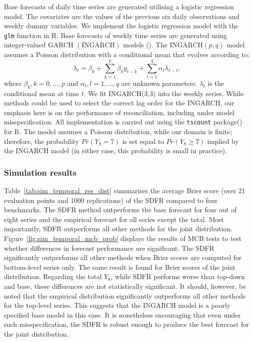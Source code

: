 \documentclass[a4paper,review,11pt,authoryear]{elsarticle}
\let\code=\texttt
\let\proglang=\textsf
\theoremstyle{definition}
\begin{document}
     Base forecasts of daily time series are generated utilising a logistic regression model. The covariates are the values of the previous six daily observations and weekly dummy variables. We implement the logistic regression model with the \code{glm} function in \proglang{R}. Base forecasts of weekly time series are generated using integer-valued GARCH $(\textrm{INGARCH})$ models (). The $\textrm{INGARCH}(p, q)$ model assumes a Poisson distribution with a conditional mean that evolves according to:
     \[
      \lambda_t = \beta_0 + \sum_{k=1}^p \beta_ky_{t-k} + \sum_{l=1}^q \alpha_l\lambda_{t-l}, 
     \] where $\beta_k, k=0,\dots,p$ and $\alpha_l, l=1,\dots,q$ are unknown parameters. $\lambda_t$ is the conditional mean at time $t$.  We fit INGARCH(3,3) into the weekly series. While methods could be used to select the correct lag order for the INGARCH, our emphasis here is on the performance of reconciliation, including under model misspecification. All implementation is carried out using the \code{tscount} package() for \proglang{R}. The model assumes a Poisson distribution, while our domain is finite; therefore, the probability $Pr(Y_8=7)$ is set equal to $Pr(Y_8\geq 7)$ implied by the INGARCH model (in either case, this probability is small in practice).


     \subsubsection{Simulation results}
     Table~\ref{tab:sim_temporal_res_dist} summarises the average Brier score (over 21 evaluation points and 1000 replications) of the SDFR compared to four benchmarks.
     The SDFR method outperforms the base forecast for four out of eight series and the empirical forecast for all series except the total. Most importantly, SDFR outperforms all other methods for the joint distribution.      Figure~\ref{fig:sim_temporal_mcb_prob} displays the results of MCB tests to test whether differences in forecast performance are significant. The SDFR significantly outperforms all other methods when Brier scores are computed for bottom-level series only. The same result is found for Brier scores of the joint distribution. Regarding the total $Y_8$, while SDFR performs worse than top-down and base, these differences are not statistically significant. It should, however, be noted that the empirical distribution significantly outperforms all other methods for the top-level series. This suggests that the INGARCH model is a poorly specified base model in this case. It is nonetheless encouraging that even under such misspecification, the SDFR is robust enough to produce the best forecast for the joint distribution.
     
\end{document}

